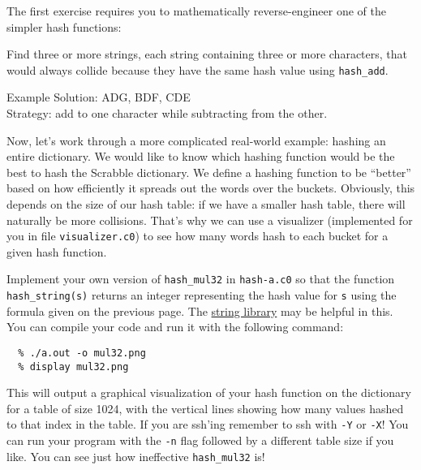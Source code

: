 \newpage
The first exercise requires you to mathematically reverse-engineer one of the
simpler hash functions:

\begin{part}
  Find three or more strings, each string containing three or more
  characters, that would always collide because they have the same
  hash value using \lstinline'hash_add'.

\onePT
\end{part}

\begin{solution}
Example Solution: ADG, BDF, CDE\\
Strategy: add to one character while subtracting from the other.
\end{solution}

Now, let's work through a more complicated real-world example: hashing
an entire dictionary. We would like to know which hashing function
would be the best to hash the Scrabble dictionary. We define a hashing
function to be ``better'' based on how efficiently it spreads out the
words over the buckets. Obviously, this depends on the size of our
hash table: if we have a smaller hash table, there will naturally be
more collisions.  That's why we can use a visualizer (implemented for
you in file \lstinline'visualizer.c0') to see how many words hash to
each bucket for a given hash function.

\begin{part}
  Implement your own version of \lstinline'hash_mul32' in
  \lstinline'hash-a.c0' so that the function
  \lstinline'hash_string(s)' returns an integer representing the hash
  value for \lstinline's' using the formula given on the previous
  page. The
  \href{http://c0.typesafety.net/doc/c0-libraries.pdf}{string library}
  may be helpful in this.  You can compile your code and run it with
  the following command:
\begin{lstlisting}[language={[coin]C}, basicstyle=\smallbasicstyle,
                   belowskip=0pt]
  % cc0 hash-a.c0 hash-dictionary.c0 visualizer.c0
  % ./a.out -o mul32.png
  % display mul32.png
\end{lstlisting}
This will output a graphical visualization of your hash function on
the dictionary for a table of size 1024, with the vertical lines
showing how many values hashed to that index in the table.  If you are
ssh'ing remember to ssh with \lstinline'-Y' or \lstinline'-X'! You can
run your program with the \lstinline'-n' flag followed by a different
table size if you like.  You can see just how ineffective
\lstinline'hash_mul32' is!
\end{part}

